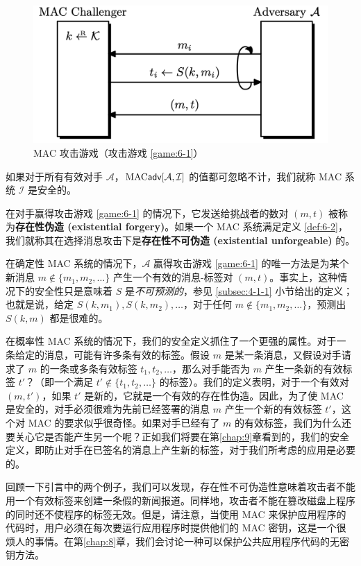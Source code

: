 \begin{figure}
  \centering
  \includegraphics[width=0.5\linewidth]{figures/chapter6/fig2.png}
  \caption{MAC 攻击游戏（攻击游戏 \ref{game:6-1}）}
  \label{fig:6-2}
\end{figure}

\begin{definition}\label{def:6-2}
如果对于所有有效对手 $\mathcal{A}$，${\rm MAC}\mathsf{adv}[\mathcal{A},\mathcal{I}]$ 的值都可忽略不计，我们就称 MAC 系统 $\mathcal{I}$ 是安全的。
\end{definition}

在对手赢得攻击游戏 \ref{game:6-1} 的情况下，它发送给挑战者的数对 $(m,t)$ 被称为\textbf{存在性伪造 (existential forgery)}。如果一个 MAC 系统满足定义 \ref{def:6-2}，我们就称其在选择消息攻击下是\textbf{存在性不可伪造 (existential unforgeable)} 的。

在确定性 MAC 系统的情况下，$\mathcal{A}$ 赢得攻击游戏 \ref{game:6-1} 的唯一方法是为某个新消息 $m\notin\{m_1,m_2,\dots\}$  产生一个有效的消息-标签对 $(m,t)$。事实上，这种情况下的安全性只是意味着 $S$ 是\emph{不可预测的}，参见 \ref{subsec:4-1-1} 小节给出的定义；也就是说，给定 $S(k,m_1),S(k,m_2),\dots$，对于任何 $m\notin\{m_1,m_2,\dots\}$，预测出 $S(k,m)$ 都是很难的。

在概率性 MAC 系统的情况下，我们的安全定义抓住了一个更强的属性。对于一条给定的消息，可能有许多条有效的标签。假设 $m$ 是某一条消息，又假设对手请求了 $m$ 的一条或多条有效标签 $t_1,t_2,\dots$，那么对手能否为 $m$ 产生一条新的有效标签 $t'$？（即一个满足 $t'\notin\{t_1,t_2,\dots\}$ 的标签）。我们的定义表明，对于一个有效对 $(m,t')$，如果 $t'$ 是新的，它就是一个有效的存在性伪造。因此，为了使 MAC 是安全的，对手必须很难为先前已经签署的消息 $m$ 产生一个新的有效标签 $t'$，这个对 MAC 的要求似乎很奇怪。如果对手已经有了 $m$ 的有效标签，我们为什么还要关心它是否能产生另一个呢？正如我们将要在第\ref{chap:9}章看到的，我们的安全定义，即防止对手在已签名的消息上产生新的标签，对于我们所考虑的应用是必要的。

回顾一下引言中的两个例子，我们可以发现，存在性不可伪造性意味着攻击者不能用一个有效标签来创建一条假的新闻报道。同样地，攻击者不能在篡改磁盘上程序的同时还不使程序的标签无效。但是，请注意，当使用 MAC 来保护应用程序的代码时，用户必须在每次要运行应用程序时提供他们的 MAC 密钥，这是一个很烦人的事情。在第\ref{chap:8}章，我们会讨论一种可以保护公共应用程序代码的无密钥方法。

